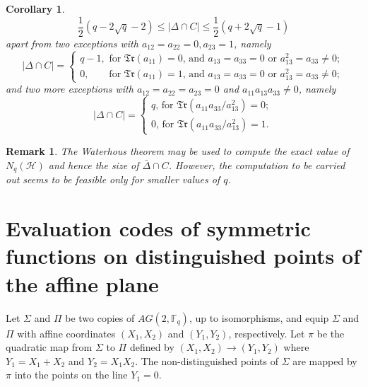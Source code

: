 \documentclass[sn-mathphys-num]{sn-jnl}%
\newtheorem{remark}{Remark}%
\newtheorem{corollary}{Corollary}%
\begin{document}
 \begin{corollary}
 \label{cor28112025}
 $$\textstyle{\frac{1}{2}}(q-2\sqrt{q}-2)\le |\Delta\cap C|\le
 \textstyle{\frac{1}{2}}(q+2\sqrt{q}-1)$$
 apart from two exceptions with $a_{12}=a_{22}=0, a_{23}=1$, namely
 $$|\Delta\cap C|=
 \begin{cases}
 q-1,\,\, \mbox{for $\mathfrak{Tr}(a_{11})=0$, and  $a_{13}=a_{33}=0$ or $a_{13}^2=a_{33}\ne 0$};\\
 0,\quad \,\,\,\,\,\, \mbox{for $\mathfrak{Tr}(a_{11})=1$, and  $a_{13}=a_{33}=0$ or $a_{13}^2=a_{33}\ne 0$};
 \end{cases} 
$$
and two more exceptions with $a_{12}=a_{22}=a_{23}=0$ and $a_{11}a_{13}a_{33}\ne 0$, namely
$$|\Delta\cap C|=
\begin{cases}
{\mbox{$q$, for $\mathfrak{Tr}(a_{11}a_{33}/a_{13}^2)=0$}};\\
{\mbox{$0$, for $\mathfrak{Tr}(a_{11}a_{33}/a_{13}^2)=1$}}.
\end{cases}
$$
\end{corollary}
\begin{remark}
\label{rem17112025} \emph{The Waterhous theorem may be used to compute the exact value of $N_q(\mathcal{H})$ and hence the size of $\bar{\Delta}\cap C$. However, the computation to be carried out seems to be feasible only for smaller values of $q$.}
\end{remark}

\section{Evaluation codes of symmetric functions on distinguished points of the affine plane}
\label{ap} Let $\Sigma$ and $\Pi$ be two copies of $AG(2,\mathbb{F}_q)$, up to isomorphisms, and equip $\Sigma$ and $\Pi$ with affine coordinates $(X_1,X_2)$ and $(Y_1,Y_2)$, respectively. Let $\pi$ be the quadratic map from $\Sigma$ to $\Pi$ defined by $(X_1,X_2)\rightarrow (Y_1,Y_2)$ where $Y_1=X_1+X_2$ and $Y_2=X_1X_2$. The non-distinguished points of $\Sigma$ are mapped by $\pi$ into the points on the line $Y_1=0$.
\end{document}
